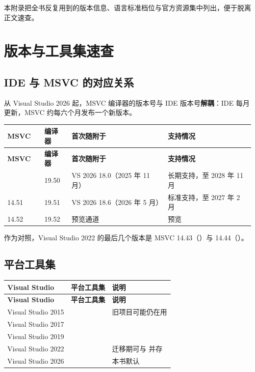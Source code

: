 本附录把全书反复用到的版本信息、语言标准档位与官方资源集中列出，便于脱离正文速查。

\section{版本与工具集速查}

\subsection{IDE 与 MSVC 的对应关系}

从 Visual Studio 2026 起，MSVC 编译器的版本号与 IDE 版本号\textbf{解耦}：IDE 每月更新，MSVC 约每六个月发布一个新版本。

\begin{longtable}{L{1.6cm}L{1.8cm}L{1.6cm}L{4.2cm}L{4.4cm}}
\toprule
\textbf{MSVC} & \textbf{} & \textbf{编译器} & \textbf{首次随附于} & \textbf{支持情况} \\
\midrule
\endfirsthead
\toprule
\textbf{MSVC} & \textbf{} & \textbf{编译器} & \textbf{首次随附于} & \textbf{支持情况} \\
\midrule
\endhead
\bottomrule
{} &  & 19.50 & VS 2026 18.0（2025 年 11 月） & 长期支持，至 2028 年 11 月 \\
14.51 &  & 19.51 & VS 2026 18.6（2026 年 5 月） & 标准支持，至 2027 年 2 月 \\
14.52 &  & 19.52 & 预览通道 & 预览 \\
\end{longtable}

作为对照，Visual Studio 2022 的最后几个版本是 MSVC 14.43（）与 14.44（）。

\subsection{平台工具集}

\begin{longtable}{L{4.4cm}L{4.4cm}L{5.6cm}}
\toprule
\textbf{Visual Studio} & \textbf{平台工具集} & \textbf{说明} \\
\midrule
\endfirsthead
\toprule
\textbf{Visual Studio} & \textbf{平台工具集} & \textbf{说明} \\
\midrule
\endhead
\bottomrule
\endlastfoot
Visual Studio 2015 &  & 旧项目可能仍在用 \\
Visual Studio 2017 &  & \\
Visual Studio 2019 &  & \\
Visual Studio 2022 &  & 迁移期可与  并存 \\
Visual Studio 2026 &  & 本书默认 \\
\end{longtable}

